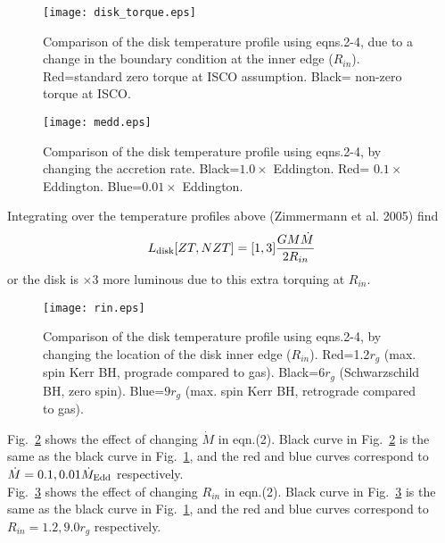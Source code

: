 \documentclass[12pt]{article}
\begin{document}
\begin{figure}
\begin{center}
\texttt{[image: disk\_torque.eps]}
\end{center}
\caption[cartoon]{
Comparison of the disk temperature profile using eqns.2-4, due to a change in the boundary condition at the inner edge ($R_{in}$). Red=standard zero torque at ISCO assumption. Black= non-zero torque at ISCO.  
\label{fig:torques}}
\end{figure}


\begin{figure}
\begin{center}
\texttt{[image: medd.eps]}
\end{center}
\caption[cartoon]{
Comparison of the disk temperature profile using eqns.2-4, by changing the accretion rate. Black=$1.0\times$ Eddington. Red= $0.1\times$Eddington. Blue=$0.01\times$ Eddington.  
\label{fig:medd}}
\end{figure}


Integrating over the temperature profiles above (Zimmermann et al. 2005) find
\begin{equation}
L_{\rm disk}[ZT,NZT]=[1,3]\frac{GM\dot{M}}{2R_{in}}
\end{equation}
or the disk is $\times 3$ more luminous due to this extra torquing at $R_{in}$.\\

\begin{figure}
\begin{center}
\texttt{[image: rin.eps]}
\end{center}
\caption[cartoon]{
Comparison of the disk temperature profile using eqns.2-4, by changing the location of the disk inner edge ($R_{in}$). Red=1.2$r_{g}$ (max. spin Kerr BH, prograde compared to gas). Black=$6r_{g}$ (Schwarzschild BH, zero spin). Blue=$9r_{g}$ (max. spin Kerr BH, retrograde compared to gas).
\label{fig:rin}}
\end{figure}

Fig.~\ref{fig:medd} shows the effect of changing $\dot{M}$ in eqn.(2). Black curve in Fig.~\ref{fig:medd} is the same as the black curve in Fig.~\ref{fig:torques}, and the red and blue curves correspond to $\dot{M}=0.1,0.01\dot{M}_{\rm Edd}$ respectively.\\

Fig.~\ref{fig:rin} shows the effect of changing $R_{in}$ in eqn.(2). Black curve in Fig.~\ref{fig:rin} is the same as the black curve in Fig.~\ref{fig:torques}, and the red and blue curves correspond to $R_{in}=1.2,9.0r_{g}$ respectively.\\
\end{document}
